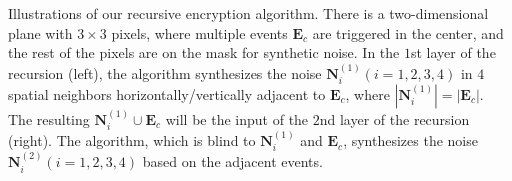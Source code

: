 \documentclass[12pt]{article}
\begin{document}
\begin{center}
\end{center}

Illustrations of our recursive encryption algorithm. There is a two-dimensional plane with $3 \times 3$ pixels, where multiple events $\mathbf{E}_c$ are triggered in the center, and the rest of the pixels are on the mask for synthetic noise. In the $1$st layer of the recursion (left), the algorithm synthesizes the noise $\mathbf{N}^{(1)}_i (i=1,2,3,4)$ in $4$ spatial neighbors horizontally/vertically adjacent to $\mathbf{E}_c$, where $|\mathbf{N}^{(1)}_i| = |\mathbf{E}_c|$. The resulting $\mathbf{N}^{(1)}_i \cup \mathbf{E}_c$ will be the input of the $2$nd layer of the recursion (right). The algorithm, which is blind to $\mathbf{N}^{(1)}_i$ and $\mathbf{E}_c$, synthesizes the noise $\mathbf{N}^{(2)}_i (i=1,2,3,4)$ based on the adjacent events.
\end{document}
